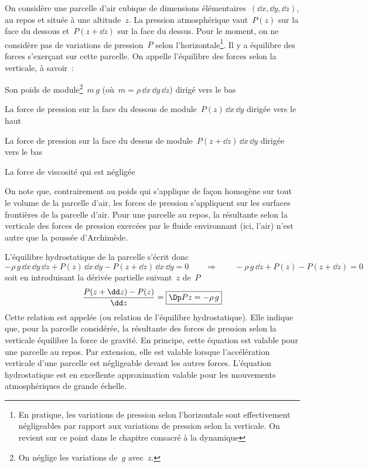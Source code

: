 \sk
On considère une parcelle d'air cubique de dimensions élémentaires~$(\dd x,\dd y, \dd z)$, au repos et située à une altitude~$z$. La pression atmosphérique vaut~$P(z)$ sur la face du dessous et~$P(z+\dd z)$ sur la face du dessus. Pour le moment, on ne considère pas de variations de pression~$P$ selon l'horizontale\footnote{En pratique, les variations de pression selon l'horizontale sont effectivement négligeables par rapport aux variations de pression selon la verticale. On revient sur ce point dans le chapitre consacré à la dynamique}. Il y a équilibre des forces s'exerçant sur cette parcelle. On appelle  l'équilibre des forces selon la verticale, à savoir~:
\begin{citemize}
\item Son poids de module\footnote{On néglige les variations de~$g$ avec~$z$.}~$m \, g$ (où~$m = \rho \, \dd x \, \dd y \, \dd z$) dirigé vers le bas
\item La force de pression sur la face du dessous de module~$P(z) \, \dd x \, \dd y$ dirigée vers le haut
\item La force de pression sur la face du dessus de module~$P(z+\dd z) \, \dd x \, \dd y$ dirigée vers le bas
\item La force de viscosité qui est négligée
\end{citemize}
On note que, contrairement au poids qui s'applique de façon homogène sur tout le volume de la parcelle d'air, les forces de pression s'appliquent sur les surfaces frontières de la parcelle d'air. 
Pour une parcelle au repos, la résultante selon la verticale des forces de pression exercées par le fluide environnant (ici, l'air) n'est autre que la poussée d'Archimède.

\sk
L'équilibre hydrostatique de la parcelle s'écrit donc
\[ - \rho \, g \, \dd x \, \dd y \, \dd z + P(z) \, \dd x \, \dd y - P(z+\dd z) \, \dd x \, \dd y = 0 \qquad \Rightarrow \qquad - \rho \, g \, \dd z + P(z) - P(z+\dd z) = 0 \]
soit en introduisant la dérivée partielle suivant~$z$ de~$P$
\[ \frac{P(z+\dd z) - P(z)}{\dd z} = \boxed{\EH} \]
Cette relation est appelée  (ou relation de l'équilibre hydrostatique). Elle indique que, pour la parcelle considérée, la résultante des forces de pression selon la verticale équilibre la force de gravité. En principe, cette équation est valable pour une parcelle au repos. Par extension, elle est valable lorsque l'accélération verticale d'une parcelle est négligeable devant les autres forces. L'équation hydrostatique est en excellente approximation valable pour les mouvements atmosphériques de grande échelle. 

